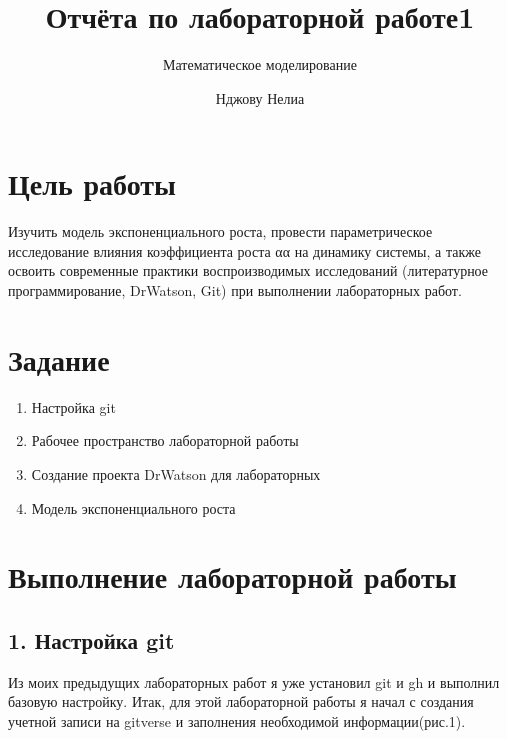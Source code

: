 \documentclass[
  12pt,
  a4paper,
  DIV=11,
  numbers=noendperiod]{scrreprt}
\title{Отчёта по лабораторной работе1}
\subtitle{Математическое моделирование}
\author{Нджову Нелиа}
\date{}
\renewcommand*\contentsname{Содержание}
\newcommand\contentsname{Содержание}
\begin{document}
\maketitle

\renewcommand*\contentsname{Содержание}
{
\setcounter{tocdepth}{1}
\tableofcontents
}
\listoffigures
\listoftables
{}
\chapter{Цель
работы}\label{ux446ux435ux43bux44c-ux440ux430ux431ux43eux442ux44b}

Изучить модель экспоненциального роста, провести параметрическое
исследование влияния коэффициента роста αα на динамику системы, а также
освоить современные практики воспроизводимых исследований (литературное
программирование, DrWatson, Git) при выполнении лабораторных работ.

\chapter{Задание}\label{ux437ux430ux434ux430ux43dux438ux435}

\begin{enumerate}
\def\labelenumi{\arabic{enumi}.}
\item
  Настройка git
\item
  Рабочее пространство лабораторной работы
\item
  Создание проекта DrWatson для лабораторных
\item
  Модель экспоненциального роста
\end{enumerate}

\chapter{Выполнение лабораторной
работы}\label{ux432ux44bux43fux43eux43bux43dux435ux43dux438ux435-ux43bux430ux431ux43eux440ux430ux442ux43eux440ux43dux43eux439-ux440ux430ux431ux43eux442ux44b}

\section{1. Настройка
git}\label{ux43dux430ux441ux442ux440ux43eux439ux43aux430-git}

Из моих предыдущих лабораторных работ я уже установил git и gh и
выполнил базовую настройку. Итак, для этой лабораторной работы я начал с
создания учетной записи на gitverse и заполнения необходимой
информации(рис.1).
\end{document}
